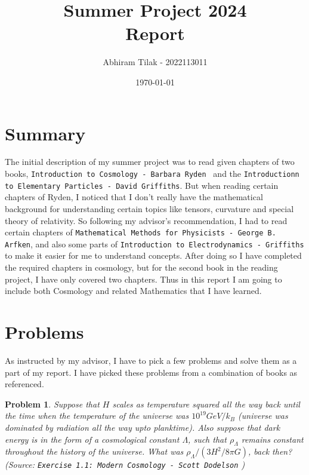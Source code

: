 \documentclass[11pt]{article}
\title{ Summer Project 2024 \\ Report }
\author{ Abhiram Tilak - 2022113011 }
\date{\today}
\newtheorem{problem}{Problem}
\begin{document}
\maketitle

\section{Summary}

The initial description of my summer project was to read given chapters of two
books, \texttt{Introduction to Cosmology - Barbara Ryden } and the
\texttt{Introductionn to Elementary Particles - David Griffiths}. But when
reading certain chapters of Ryden, I noticed that I don't really have the
mathematical background for understanding certain topics like tensors, curvature and
special theory of relativity. So following my advisor's recommendation, I
had to read certain chapters of
\texttt{Mathematical Methods for Physicists - George B. Arfken}, and also some
parts of \texttt{Introduction to Electrodynamics - Griffiths} to make it easier
for me to understand concepts. After doing so
I have completed the required chapters in cosmology, but for the second book
in the reading project, I have only covered two chapters. Thus in this report
I am going to include both Cosmology and related Mathematics that I have
learned.

\section{Problems}

As instructed by my advisor, I have to pick a few problems and solve them
as a part of my report. I have picked these problems from a combination of books
as referenced.

\begin{problem}
	Suppose that $H$ scales as temperature squared all the way back until
	the time when the temperature of the universe was $10^{19} GeV/k_B$
	(universe was dominated by radiation all the way upto planktime). Also
	suppose that dark energy is in the form of a cosmological constant
	$\Lambda$, such that $\rho_\Lambda$ remains constant throughout the
	history of the universe. What was $\rho_\Lambda/(3H^2/8\pi G)$, back
	then? (Source: \texttt{Exercise 1.1: Modern Cosmology - Scott Dodelson} )
\end{problem}
\end{document}
